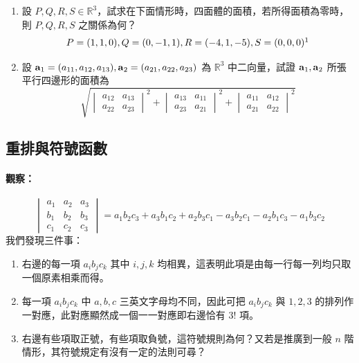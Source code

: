 \begin{enumerate}[label=\arabic*., leftmargin=2em]
  \item 設 $P, Q, R, S \in \mathbb{R}^3$，試求在下面情形時，四面體的面積，若所得面積為零時，則 $P, Q, R, S$ 之關係為何？
  \label{note:b6s-ch1-p30-s-coord}%
  \[ P=(1, 1, 0), Q=(0, -1, 1), R=(-4, 1, -5), S=(0, 0, 0)\footnotemark \]

  \item 設 $\boldsymbol{\mathbf{a}}_1=(a_{11}, a_{12}, a_{13}), \boldsymbol{\mathbf{a}}_2=(a_{21}, a_{22}, a_{23})$ 為 $\mathbb{R}^3$ 中二向量，試證 $\boldsymbol{\mathbf{a}}_1, \boldsymbol{\mathbf{a}}_2$ 所張平行四邊形的面積為
  \[ \sqrt{\begin{vmatrix} a_{12} & a_{13} \\ a_{22} & a_{23} \end{vmatrix}^2 + \begin{vmatrix} a_{13} & a_{11} \\ a_{23} & a_{21} \end{vmatrix}^2 + \begin{vmatrix} a_{11} & a_{12} \\ a_{21} & a_{22} \end{vmatrix}^2} \]
\end{enumerate}

\subsection{重排與符號函數}\label{sec:b6s-1-3}
\resetsectcounters

\paragraph{觀察：}
\begin{equation}
\begin{vmatrix}
a_1 & a_2 & a_3 \\
b_1 & b_2 & b_3 \\
c_1 & c_2 & c_3
\end{vmatrix} = a_1 b_2 c_3 + a_3 b_1 c_2 + a_2 b_3 c_1 - a_3 b_2 c_1 - a_2 b_1 c_3 - a_1 b_3 c_2 \label{eq:b6s-1-3-1}
\end{equation}
我們發現三件事：
\begin{enumerate}[label=\arabic*., leftmargin=2em]
  \item 右邊的每一項 $a_i b_j c_k$ 其中 $i, j, k$ 均相異，這表明此項是由每一行每一列均只取一個原素相乘而得。
  \item 每一項 $a_i b_j c_k$ 中 $a, b, c$ 三英文字母均不同，因此可把 $a_i b_j c_k$ 與 $1, 2, 3$ 的排列作一對應，此對應顯然成一個一一對應即右邊恰有 $3!$ 項。
  \item 右邊有些項取正號，有些項取負號，這符號規則為何？又若是推廣到一般 $n$ 階情形，其符號規定有沒有一定的法則可尋？
\end{enumerate}

